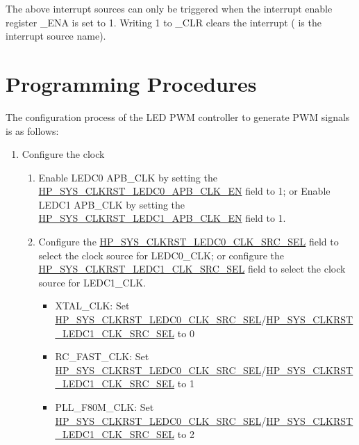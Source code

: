 \documentclass[main\_\_EN.tex]{subfiles}
\begin{document}
The above interrupt sources can only be triggered when the interrupt enable register \_ENA is set to 1.  Writing 1 to \_CLR clears the interrupt ( is the interrupt source name).


\section{Programming Procedures}
\label{sec:ledc-prog-procedures}

The configuration process of the LED PWM controller to generate PWM signals is as follows:

\begin{enumerate}
    \item Configure the clock\label{sec:ledc-clk-cfg}
        \begin{enumerate}
            \item Enable LEDC0 APB\_CLK by setting the \hyperref[fielddesc:HPSYSCLKRSTLEDC0APBCLKEN]{HP\_SYS\_CLKRST\_LEDC0\_APB\_CLK\_EN} field to 1; or Enable LEDC1 APB\_CLK by setting the \hyperref[fielddesc:HPSYSCLKRSTLEDC1APBCLKEN]{HP\_SYS\_CLKRST\_LEDC1\_APB\_CLK\_EN} field to 1.
            \item Configure the \hyperref[fielddesc:HPSYSCLKRSTLEDC0CLKSRCSEL]{HP\_SYS\_CLKRST\_LEDC0\_CLK\_SRC\_SEL} field to select the clock source for LEDC0\_CLK; or configure the \hyperref[fielddesc:HPSYSCLKRSTLEDC1CLKSRCSEL]{HP\_SYS\_CLKRST\_LEDC1\_CLK\_SRC\_SEL} field to select the clock source for LEDC1\_CLK.
                \begin{itemize}
                    \item XTAL\_CLK: Set \hyperref[fielddesc:HPSYSCLKRSTLEDC0CLKSRCSEL]{HP\_SYS\_CLKRST\_LEDC0\_CLK\_SRC\_SEL}/\hyperref[fielddesc:HPSYSCLKRSTLEDC1CLKSRCSEL]{HP\_SYS\_CLKRST\_LEDC1\_CLK\_SRC\_SEL} to 0
                    \item RC\_FAST\_CLK: Set \hyperref[fielddesc:HPSYSCLKRSTLEDC0CLKSRCSEL]{HP\_SYS\_CLKRST\_LEDC0\_CLK\_SRC\_SEL}/\hyperref[fielddesc:HPSYSCLKRSTLEDC1CLKSRCSEL]{HP\_SYS\_CLKRST\_LEDC1\_CLK\_SRC\_SEL} to 1
                    \item PLL\_F80M\_CLK: Set \hyperref[fielddesc:HPSYSCLKRSTLEDC0CLKSRCSEL]{HP\_SYS\_CLKRST\_LEDC0\_CLK\_SRC\_SEL}/\hyperref[fielddesc:HPSYSCLKRSTLEDC1CLKSRCSEL]{HP\_SYS\_CLKRST\_LEDC1\_CLK\_SRC\_SEL} to 2
                \end{itemize}

\end{enumerate}
\end{enumerate}
\end{document}
